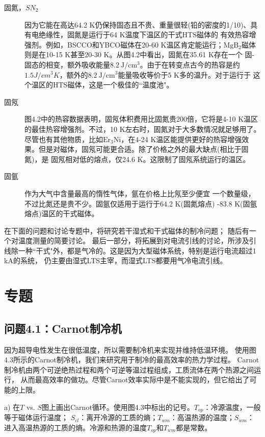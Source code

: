 \begin{description}
  \item[固氮，$SN_2$] 因为它能在高达64.2 K仍保持固态且不贵、重量很轻(铅的密度的1/10)、具有电绝缘性，固氮是运行于64 K温度下温区的干式HTS磁体的
  有效热容增强剂。例如，BSCCO和YBCO磁体在20-60 K温区肯定能运行；$\mathrm{MgB_2}$磁体则是在10-15 K甚至20-30 K。从图4.2中看出，固氮在35.61 K存在一个
  固-固态的相变，额外吸收能量$8.2\ \mathrm{ J/cm^3}$。由于在转变点古今的热容是约$1.5J/cm^3 K$，额外的$8.2\ \mathrm{ J/cm^3}$能量吸收等价于5 K多的温升。对于运行于
  这个温区的HTS磁体，这是一个极佳的``温度池"。
  \item[固氖] 图4.2中的热容数据表明，固氖体积费用比固氮贵200倍，它将是4-10 K温区的最佳热容增强剂。不过，10 K左右时，固氮对于大多数情况就足够用了。
  尽管也有其他物质，比如$\mathrm{Er_3 Ni}$，在4-24 K温区能提供更好的热容增强效果。但是对磁体，固氖可能更合适。除了价格之外的最大缺点(相比于固氮)，是
  固氖相对低的熔点，仅24.6 K。这限制了固氖系统运行的温区。
  \item[固氩] 作为大气中含量最高的惰性气体，氩在价格上比氖至少便宜 一个数量级，不过比氮还是贵不少。固氩仅适用于运行于64.2 K(固氮熔点)
  -83.8 K(固氩熔点)温区的干式磁体。
\end{description}

在下面的问题和讨论专题中，将研究若干湿式和干式磁体的制冷问题；
随后有一个对温度测量的简要讨论。
最后一部分，将拓展到对电流引线的讨论，所涉及引线除一种``干式"外，都是气冷的。这是因为大型磁体系统，特别是运行电流超过1 kA的系统，
仍主要由湿式LTS主宰，而湿式LTS都要用气冷电流引线。

\section{专题}
\subsection{问题4.1：Carnot制冷机}
因为超导电性发生在很低温度，所以需要制冷机来实现并维持低温环境。
使用图4.3所示的Carnot制冷机，我们来研究用于制冷的最高效率的热力学过程。
Carnot制冷机由两个可逆绝热过程和两个可逆等温过程组成，工质流体在两个热源之间运行，
从而最高效率的做功。尽管Carnot效率实际中是不能实现的，但它给出了可能的上限。

a) 在$T$ vs. $S$图上画出Carnot循环。使用图4.3中标出的记号。$T_{op}$：冷源温度，一般等于磁体运行温度；
$S_{cl}$：离开冷源的工质的熵；$T_{wm}$：高温热源的温度；$S_{wm}$：进入高温热源的工质的熵。冷源和热源的温度$T_{op}$和$T_{wm}$都是常数。

